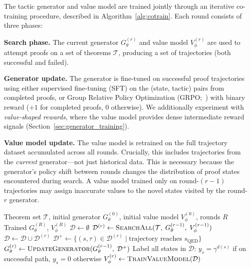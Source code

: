 \documentclass{article}
\begin{document}
The tactic generator and value model are trained jointly through an iterative co-training procedure, described in Algorithm~\ref{alg:cotrain}. Each round consists of three phases:

\textbf{Search phase.} The current generator $G_\theta^{(r)}$ and value model $V_\phi^{(r)}$ are used to attempt proofs on a set of theorems $\mathcal{T}$, producing a set of trajectories (both successful and failed).

\textbf{Generator update.} The generator is fine-tuned on successful proof trajectories using either supervised fine-tuning (SFT) on the (state, tactic) pairs from completed proofs, or Group Relative Policy Optimization (GRPO;~\citealt{shao2024deepseekmath}) with binary reward ($+1$ for completed proofs, $0$ otherwise). We additionally experiment with \emph{value-shaped rewards}, where the value model provides dense intermediate reward signals (Section~\ref{sec:generator_training}).

\textbf{Value model update.} The value model is retrained on the full trajectory dataset accumulated across all rounds. Crucially, this includes trajectories from the \emph{current} generator---not just historical data. This is necessary because the generator's policy shift between rounds changes the distribution of proof states encountered during search. A value model trained only on round-$(r{-}1)$ trajectories may assign inaccurate values to the novel states visited by the round-$r$ generator.

\begin{algorithm}[t]
\caption{Co-Training Loop}
\label{alg:cotrain}
\begin{algorithmic}[1]
\REQUIRE Theorem set $\mathcal{T}$, initial generator $G_\theta^{(0)}$, initial value model $V_\phi^{(0)}$, rounds $R$
\ENSURE Trained $G_\theta^{(R)}$, $V_\phi^{(R)}$
\STATE $\mathcal{D} \leftarrow \emptyset$ 
    \STATE {}
    \STATE $\mathcal{D}^{(r)} \leftarrow \textsc{SearchAll}(\mathcal{T},\; G_\theta^{(r-1)},\; V_\phi^{(r-1)})$
    \STATE $\mathcal{D} \leftarrow \mathcal{D} \cup \mathcal{D}^{(r)}$
    \STATE
    \STATE {}
    \STATE $\mathcal{D}^+ \leftarrow \{(s, \tau) \in \mathcal{D}^{(r)} \mid \text{trajectory reaches } s_\text{QED}\}$
    \STATE $G_\theta^{(r)} \leftarrow \textsc{UpdateGenerator}(G_\theta^{(r-1)},\; \mathcal{D}^+)$ 
    \STATE
    \STATE {}
    \STATE Label all states in $\mathcal{D}$: $y_s = \gamma^{d(s)}$ if on successful path, $y_s = 0$ otherwise
    \STATE $V_\phi^{(r)} \leftarrow \textsc{TrainValueModel}(\mathcal{D})$
\ENDFOR
\end{algorithmic}
\end{algorithm}
\end{document}
